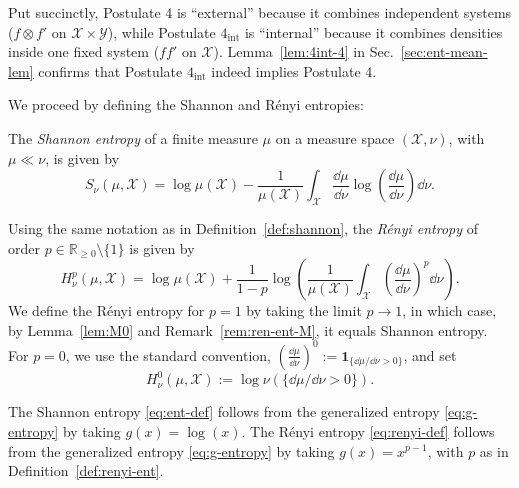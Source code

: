 \documentclass[reqno]{amsart}
\begin{document}
Put succinctly, Postulate 4 is ``external'' because it combines independent systems  ($f\otimes f'$ on $\mathcal{X}\times\mathcal Y$), while Postulate $4_{\mathrm{int}}$ is ``internal'' because it combines densities inside one fixed system ($ff'$ on $\mathcal{X}$). Lemma~\ref{lem:4int-4} in Sec.~\ref{sec:ent-mean-lem} confirms that Postulate $4_{\mathrm{int}}$ indeed implies Postulate 4.


We proceed by defining the Shannon and R\'enyi entropies:
\begin{definition}
\label{def:shannon}
The \textit{Shannon entropy} 
of a  finite  measure $\mu$  on a measure space $(\mathcal{X}, \nu)$, with $\mu \ll \nu$, is given by
\begin{equation}
 \label{eq:ent-def}
S_\nu(\mu,\mathcal{X}) 
= \log \mu(\mathcal{X}) 
 - \frac{1}{\mu({\mathcal{X}})} \int_{{\mathcal{X}}}   \dfrac{\dd \mu}{\dd \nu} 
 \log \left(\dfrac{\dd\mu}{\dd \nu} \right)  \dd \nu  .
\end{equation}
\end{definition}

\begin{definition}
\label{def:renyi-ent}
Using the same notation as in Definition~\ref{def:shannon}, the \textit{R\'enyi entropy} of order $p \in \mathbb{R}_{\geq 0} \setminus \{1\}$ is given by
\begin{equation}
 \label{eq:renyi-def}
H^p_\nu(\mu,\mathcal{X}) 
=  \log \mu(\mathcal{X}) + \dfrac{1}{1-p }  \log \left( 
 \frac{1}{\mu({\mathcal{X}})} \int_{{\mathcal{X}}} \left(\dfrac{\dd \mu}{\dd \nu} \right)^p
 \dd \nu \right) .
\end{equation}
We define the R\'enyi entropy for $p=1$ by taking the limit $p \rightarrow 1$, in which case, by Lemma~\ref{lem:M0} and Remark~\ref{rem:ren-ent-M}, it equals Shannon entropy. 
For $p=0$, we use the standard convention,
$\left(\frac{\dd\mu}{\dd\nu}\right)^0
:=
\mathbf 1_{\{\dd\mu/\dd\nu>0\}}$,
and set
$$
H_\nu^0(\mu,\mathcal X) :=\log\nu(\{\dd\mu/\dd\nu>0\}).
$$
\end{definition}

\begin{remark}
    The Shannon entropy \eqref{eq:ent-def} follows from the generalized entropy \eqref{eq:g-entropy} by taking $g(x) = \log (x)$.
    The R\'enyi entropy \eqref{eq:renyi-def} follows from the generalized entropy \eqref{eq:g-entropy} by taking $g(x) = x^{p-1}$, with $p$ as in Definition~\ref{def:renyi-ent}.
\end{remark}
\end{document}
